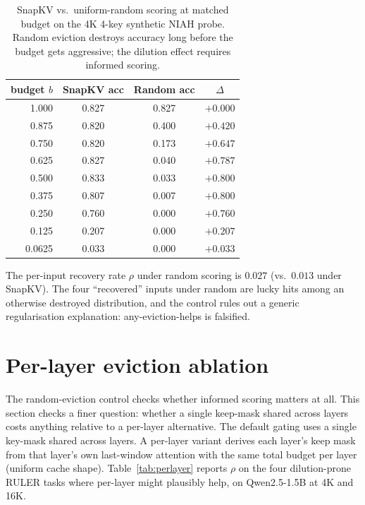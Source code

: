 \begin{table}[h]
\centering
\caption{SnapKV vs.\ uniform-random scoring at matched budget on the 4K
4-key synthetic NIAH probe. Random eviction destroys accuracy long before
the budget gets aggressive; the dilution effect requires informed scoring.}
\label{tab:random-control}
\begin{tabular}{rccc}
\toprule
budget $b$ & SnapKV acc & Random acc & $\Delta$ \\
\midrule
1.000  & 0.827 & 0.827 & $+0.000$ \\
0.875  & 0.820 & 0.400 & $+0.420$ \\
0.750  & 0.820 & 0.173 & $+0.647$ \\
0.625  & 0.827 & 0.040 & $+0.787$ \\
0.500  & 0.833 & 0.033 & $+0.800$ \\
0.375  & 0.807 & 0.007 & $+0.800$ \\
0.250  & 0.760 & 0.000 & $+0.760$ \\
0.125  & 0.207 & 0.000 & $+0.207$ \\
0.0625 & 0.033 & 0.000 & $+0.033$ \\
\bottomrule
\end{tabular}
\end{table}

The per-input recovery rate $\rho$ under random scoring is $0.027$
(vs.\ $0.013$ under SnapKV). The four ``recovered'' inputs under random
are lucky hits among an otherwise destroyed distribution, and the control
rules out a generic regularisation explanation: any-eviction-helps is
falsified.

\section{Per-layer eviction ablation}
\label{app:per-layer}

The random-eviction control checks whether informed scoring matters at
all. This section checks a finer question: whether a single keep-mask
shared across layers costs anything relative to a per-layer alternative.
The default gating uses a single key-mask shared across layers. A per-layer
variant derives each layer's keep mask from that layer's own last-window
attention with the same total budget per layer (uniform cache shape).
Table~\ref{tab:perlayer} reports $\rho$ on the four dilution-prone RULER tasks
where per-layer might plausibly help, on Qwen2.5-1.5B at 4K and 16K.

